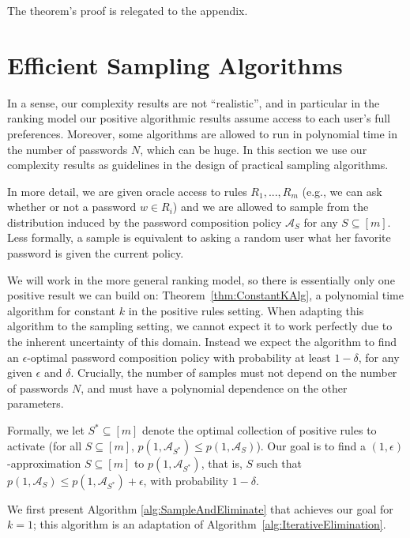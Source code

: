 \documentclass[prodmode,acmec]{ec-acmsmall}
\begin{document}
The theorem's proof is relegated to the appendix. 




\section{Efficient Sampling Algorithms} \label{sec:efficientsampling}

In a sense, our complexity results are not ``realistic'', and in particular in the ranking model our positive algorithmic results assume access to each user's full preferences. Moreover, some algorithms are allowed to run in polynomial time in the number of passwords $N$, which can be huge. In this section we use our complexity results as guidelines in the design of practical sampling algorithms. 

In more detail, we are given oracle access to rules $R_1,...,R_m$ (e.g., we can ask whether or not a password $w \in R_i$) and we are allowed to sample from the distribution induced by the password composition policy $\mathcal{A}_S$ for any $S \subseteq [m]$. Less formally, a sample is equivalent to asking a random user what her favorite password is given the current policy. 

We will work in the more general ranking model, so there is essentially only one positive result we can build on: Theorem~\ref{thm:ConstantKAlg}, a polynomial time algorithm for constant $k$ in the positive rules setting. When adapting this algorithm to the sampling setting, we cannot expect it to work perfectly due to the inherent uncertainty of this domain. Instead we expect the algorithm to find an $\epsilon$-optimal password composition policy with probability at least $1-\delta$, for any given $\epsilon$ and $\delta$. Crucially, the number of samples must not depend on the number of passwords $N$, and must have a polynomial dependence on the other parameters. 

Formally, we let $S^* \subseteq [m]$ denote the optimal collection of positive rules to activate (for all $S \subseteq [m]$, $p\left(1,\mathcal{A}_{S^*}\right) \leq p\left(1,\mathcal{A}_{S}\right)$). Our goal is to find a $(1,\epsilon)$-approximation $S \subseteq [m]$ to $p\left(1,\mathcal{A}_{S^*}\right)$, that is, $S$ such that $p\left(1,\mathcal{A}_{S}\right) \leq p\left(1,\mathcal{A}_{S^*}\right)+\epsilon$, with probability $1-\delta$.

We first present Algorithm \ref{alg:SampleAndEliminate} that achieves our goal for $k=1$; this algorithm is an adaptation of Algorithm~\ref{alg:IterativeElimination}. 
\end{document}

